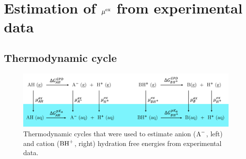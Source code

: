 \documentclass[journal=jacsat,articletitle=true,manuscript=suppinfo,layout=onecolumn]{achemso}
\begin{document}
    \clearpage
    \section{Estimation of $\mu^{\rm{ex}}$ from experimental data}
    
    \subsection{Thermodynamic cycle}
    
    \begin{figure}[H]
    \begin{center}
        \includegraphics[width=1\columnwidth]{images/thermo_cycle_v1.png}
        \caption{Thermodynamic cycles that were used to estimate anion ($\ce{A^-}$, left) and cation ($\ce{BH^+}$, right) hydration free energies from experimental data.}
        \label{fig:thermo_cycle}
    \end{center}
    \end{figure}
    
\end{document}
